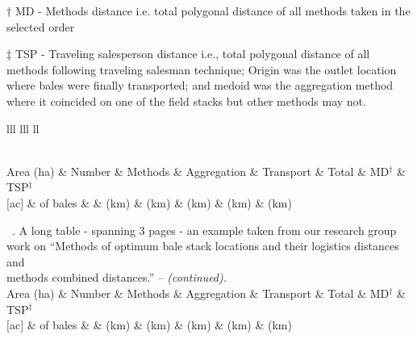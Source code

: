 \documentclass[phd]{ndsu-thesis-2022}
\newcommand\tabletopinfo{
\toprule
Area (ha) & Number  & Methods & Aggregation & Transport & Total & MD$^\dag$ & TSP$^\ddag$ \\
$[$ac$]$ & of bales  &  & (km) & (km) & (km) & (km) & (km) \\
    \midrule 
}
\begin{document}
{\small 
{\renewcommand{\arraystretch}{0.6}
\begin{ThreePartTable}
  \begin{TableNotes}
  \baselineskip
    \item[] $\dag$ MD - Methods distance i.e. total polygonal distance of all methods taken in the selected order    
    \item[] $\ddag$ TSP - Traveling salesperson distance i.e., total polygonal distance of all methods following traveling salesman technique; Origin was the outlet location where bales were finally transported; and medoid was the aggregation method where it coincided on one of the field stacks but other methods may not.
  \end{TableNotes}
  \begin{longtable}{lll lll ll}
  \caption{\normalsize A long table - spanning 3 pages - an example taken from our research group work on ``Methods of optimum bale stack locations and their logistics distances and methods combined distances.''}
  \label{tab13}\\[-2ex]     
  \tabletopinfo%
    \endfirsthead
    
{{\normalsize\tablename\ \thetable{}.  A long table - spanning 3 pages - an example taken from our research group}} \\ 
{{\normalsize work on ``Methods of optimum bale stack locations and their logistics distances and }} \\
{{\normalsize methods combined distances.'' -- \emph{(continued).}}} \\[2ex] 
 \tabletopinfo
    \endhead
    
    \endfoot
    \bottomrule
    \insertTableNotes
    \endlastfoot
        

\end{longtable}
\end{ThreePartTable}}}
\end{document}
